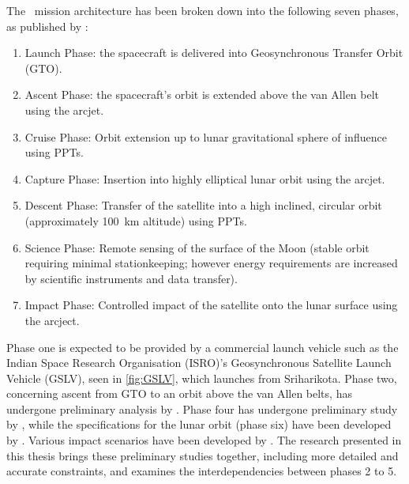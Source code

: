 The \BW\ mission architecture has been broken down into the following seven phases, as published by \textcite{web_BW-1}:
\begin{enumerate}
  \item Launch Phase: the spacecraft is delivered into Geosynchronous Transfer Orbit (GTO).
  \item Ascent Phase: the spacecraft's orbit is extended above the van Allen belt using the arcjet.
  \item Cruise Phase: Orbit extension up to lunar gravitational sphere of influence using PPTs.
  \item Capture Phase: Insertion into highly elliptical lunar orbit using the arcjet.
  \item Descent Phase: Transfer of the satellite into a high inclined, circular orbit (approximately 100~km altitude) using PPTs.
  \item Science Phase: Remote sensing of the surface of the Moon (stable orbit requiring minimal stationkeeping; however energy requirements are increased by scientific instruments and data transfer).
  \item Impact Phase: Controlled impact of the satellite onto the lunar surface using the arcject.
\end{enumerate}
Phase one is expected to be provided by a commercial launch vehicle such as the Indian Space Research Organisation (ISRO)'s Geosynchronous Satellite Launch Vehicle (GSLV), seen in \autoref{fig:GSLV}, which launches from Sriharikota. Phase two, concerning ascent from GTO to an orbit above the van Allen belts, has undergone preliminary analysis by \textcite{Letterio_thesis}. Phase four has undergone preliminary study by \textcite{Moellman2005}, while the specifications for the lunar orbit (phase six) have been developed by \textcite{Zeile2010}. Various impact scenarios have been developed by \textcite{Trawny2004}. The research presented in this thesis brings these preliminary studies together, including more detailed and accurate constraints, and examines the interdependencies between phases 2 to 5.

